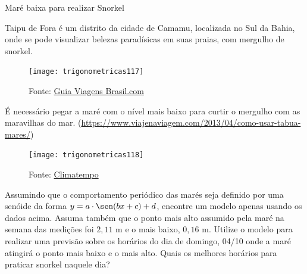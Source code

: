 \begin{task}{Maré baixa para realizar Snorkel}

Taipu de Fora é um distrito da cidade de Camamu, localizada no Sul da Bahia, onde se pode visualizar belezas paradísicas em suas praias, com mergulho de snorkel.

\begin{figure}[H]
\centering

\texttt{[image: trigonometricas117]}
\caption{Fonte: \href{guiaviagensbrasil.com}{Guia Viagens Brasil.com}}
\label{}
\end{figure}

É necessário pegar a maré com o nível mais baixo para curtir o mergulho com as maravilhas do mar. (\url{https://www.viajenaviagem.com/2013/04/como-usar-tabua-mares/})

\begin{figure}[H]
\centering

\texttt{[image: trigonometricas118]}
\caption{Fonte: \href{https://www.climatempo.com.br/tabua-de-mares}{Climatempo}}
\label{}
\end{figure}

Assumindo que o comportamento periódico das marés seja definido por uma senóide da forma $y = a\cdot\sen(bx+c) + d$, encontre um modelo apenas usando os dados acima. Assuma também que o ponto mais alto assumido pela maré na semana das medições foi $2{,}11$ m e o mais baixo, $0{,}16$ m. Utilize o modelo para realizar uma previsão sobre os horários do dia de domingo, 04/10 onde a maré atingirá o ponto mais baixo e o mais alto. Quais os melhores horários para praticar snorkel naquele dia?
\end{task}

\clearpage

\exercise

